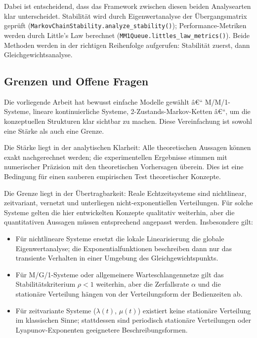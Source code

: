 ﻿\documentclass[a4paper,12pt]{report}
\theoremstyle{definition}
\begin{document}
Dabei ist entscheidend, dass das Framework zwischen diesen beiden Analysearten
klar unterscheidet.  Stabilität wird durch Eigenwertanalyse der
Übergangsmatrix geprüft (\texttt{MarkovChainStability.analyze\_stability()});
Performance-Metriken werden durch Little's Law berechnet
(\texttt{MM1Queue.littles\_law\_metrics()}).  Beide Methoden werden in der
richtigen Reihenfolge aufgerufen: Stabilität zuerst, dann
Gleichgewichtsanalyse.

\subsection{Grenzen und Offene Fragen}

Die vorliegende Arbeit hat bewusst einfache Modelle gewählt â€“ M/M/1-Systeme,
lineare kontinuierliche Systeme, 2-Zustands-Markov-Ketten â€“, um die
konzeptuellen Strukturen klar sichtbar zu machen.  Diese Vereinfachung ist
sowohl eine Stärke als auch eine Grenze.

Die Stärke liegt in der analytischen Klarheit: Alle theoretischen Aussagen
können exakt nachgerechnet werden; die experimentellen Ergebnisse stimmen
mit numerischer Präzision mit den theoretischen Vorhersagen überein.  Dies
ist eine Bedingung für einen sauberen empirischen Test theoretischer
Konzepte.

Die Grenze liegt in der Übertragbarkeit: Reale Echtzeitsysteme sind
nichtlinear, zeitvariant, vernetzt und unterliegen nicht-exponentiellen
Verteilungen.  Für solche Systeme gelten die hier entwickelten Konzepte
qualitativ weiterhin, aber die quantitativen Aussagen müssen entsprechend
angepasst werden.  Insbesondere gilt:
\begin{itemize}
	\item[-] Für nichtlineare Systeme ersetzt die lokale Linearisierung die
	globale Eigenwertanalyse; die Exponentialfunktionen beschreiben
	dann nur das transiente Verhalten in einer Umgebung des
	Gleichgewichtspunkts.
	\item[-] Für M/G/1-Systeme oder allgemeinere Warteschlangennetze
	gilt das Stabilitätskriterium $\rho < 1$ weiterhin, aber die
	Zerfallsrate $\alpha$ und die stationäre Verteilung hängen von
	der Verteilungsform der Bedienzeiten ab.
	\item[-] Für zeitvariante Systeme ($\lambda(t)$, $\mu(t)$) existiert
	keine stationäre Verteilung im klassischen Sinne; stattdessen
	sind periodisch stationäre Verteilungen oder
	Lyapunov-Exponenten geeignetere Beschreibungsformen.
\end{itemize}
\end{document}

